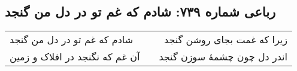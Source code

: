 \begin{center}
\section*{رباعی شماره ۷۳۹: شادم که غم تو در دل من گنجد}
\label{sec:0739}
\begin{longtable}{l p{0.5cm} r}
شادم که غم تو در دل من گنجد
&&
زیرا که غمت بجای روشن گنجد
\\
آن غم که نگنجد در افلاک و زمین
&&
اندر دل چون چشمهٔ سوزن گنجد
\\
\end{longtable}
\end{center}
